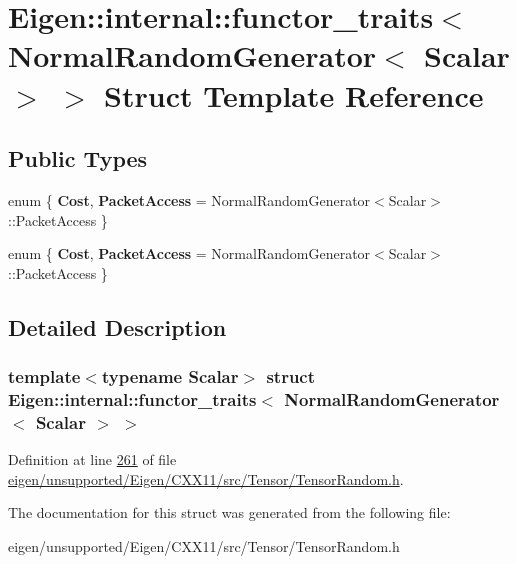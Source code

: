 \hypertarget{struct_eigen_1_1internal_1_1functor__traits_3_01_normal_random_generator_3_01_scalar_01_4_01_4}{}\section{Eigen\+:\+:internal\+:\+:functor\+\_\+traits$<$ Normal\+Random\+Generator$<$ Scalar $>$ $>$ Struct Template Reference}
\label{struct_eigen_1_1internal_1_1functor__traits_3_01_normal_random_generator_3_01_scalar_01_4_01_4}
\subsection*{Public Types}
\begin{DoxyCompactItemize}
\item 
\mbox{\label{struct_eigen_1_1internal_1_1functor__traits_3_01_normal_random_generator_3_01_scalar_01_4_01_4_ab154fad44444a60015d1fb254afb4d1e}} 
enum \{ {\bfseries Cost}, 
{\bfseries Packet\+Access} = Normal\+Random\+Generator$<$Scalar$>$\+:\+:Packet\+Access
 \}
\item 
\mbox{\label{struct_eigen_1_1internal_1_1functor__traits_3_01_normal_random_generator_3_01_scalar_01_4_01_4_a20b49a8da7f2fad5f4bf2426175f803d}} 
enum \{ {\bfseries Cost}, 
{\bfseries Packet\+Access} = Normal\+Random\+Generator$<$Scalar$>$\+:\+:Packet\+Access
 \}
\end{DoxyCompactItemize}


\subsection{Detailed Description}
\subsubsection*{template$<$typename Scalar$>$\newline
struct Eigen\+::internal\+::functor\+\_\+traits$<$ Normal\+Random\+Generator$<$ Scalar $>$ $>$}



Definition at line \hyperlink{eigen_2unsupported_2_eigen_2_c_x_x11_2src_2_tensor_2_tensor_random_8h_source_l00261}{261} of file \hyperlink{eigen_2unsupported_2_eigen_2_c_x_x11_2src_2_tensor_2_tensor_random_8h_source}{eigen/unsupported/\+Eigen/\+C\+X\+X11/src/\+Tensor/\+Tensor\+Random.\+h}.



The documentation for this struct was generated from the following file\+:\begin{DoxyCompactItemize}
\item 
eigen/unsupported/\+Eigen/\+C\+X\+X11/src/\+Tensor/\+Tensor\+Random.\+h\end{DoxyCompactItemize}
